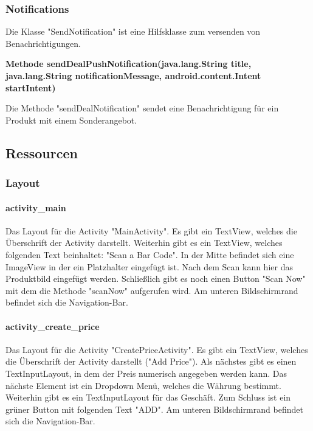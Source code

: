 \documentclass{scrartcl}
\begin{document}
\subsubsection{Notifications}
Die Klasse "SendNotification" ist eine Hilfsklasse zum versenden von Benachrichtigungen. \newline 

\noindent\textbf{Methode sendDealPushNotification(java.lang.String title, \newline         java.lang.String notificationMessage,                                    android.content.Intent startIntent)}

\noindent Die Methode "sendDealNotification" sendet eine Benachrichtigung für ein Produkt mit einem Sonderangebot. \newline 

\subsection{Ressourcen}

\subsubsection{Layout}

\paragraph{activity\_main} \mbox{} 

\noindent Das Layout für die Activity "MainActivity". Es gibt ein TextView, welches die Überschrift der Activity darstellt. Weiterhin gibt es ein TextView, welches folgenden Text beinhaltet: "Scan a Bar Code". In der Mitte befindet sich eine ImageView in der ein Platzhalter eingefügt ist. Nach dem Scan kann hier das Produktbild eingefügt werden. Schließlich gibt es noch einen Button "Scan Now" mit dem die Methode "scanNow" aufgerufen wird. Am unteren Bildschirmrand befindet sich die Navigation-Bar.

\paragraph{activity\_create\_price} \mbox{} 

\noindent Das Layout für die Activity "CreatePriceActivity". Es gibt ein TextView, welches die Überschrift der Activity darstellt ("Add Price"). Als nächstes gibt es einen TextInputLayout, in dem der Preis numerisch angegeben werden kann. Das nächste Element ist ein Dropdown Menü, welches die Währung bestimmt. Weiterhin gibt es ein TextInputLayout für das Geschäft. Zum Schluss ist ein grüner Button mit folgenden Text "ADD". Am unteren Bildschirmrand befindet sich die Navigation-Bar. 
\end{document}
